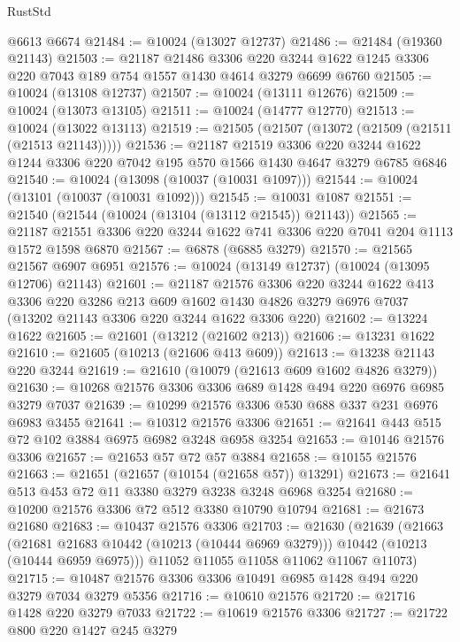 \begin{lexlean}{RustStd}
\begin{coremodule}
    @6613
    @6674
@21484 := @10024 (@13027 @12737)
@21486 := @21484 (@19360 @21143)
@21503 := @21187
    @21486
    @3306
    @220
    @3244
    @1622
    @1245
    @3306
    @220
    @7043
    @189
    @754
    @1557
    @1430
    @4614
    @3279
    @6699
    @6760
@21505 := @10024 (@13108 @12737)
@21507 := @10024 (@13111 @12676)
@21509 := @10024 (@13073 @13105)
@21511 := @10024 (@14777 @12770)
@21513 := @10024 (@13022 @13113)
@21519 := @21505 (@21507 (@13072 (@21509 (@21511 (@21513 @21143)))))
@21536 := @21187
    @21519
    @3306
    @220
    @3244
    @1622
    @1244
    @3306
    @220
    @7042
    @195
    @570
    @1566
    @1430
    @4647
    @3279
    @6785
    @6846
@21540 := @10024 (@13098 (@10037 (@10031 @1097)))
@21544 := @10024 (@13101 (@10037 (@10031 @1092)))
@21545 := @10031 @1087
@21551 := @21540 (@21544 (@10024 (@13104 (@13112 @21545)) @21143))
@21565 := @21187 @21551 @3306 @220 @3244 @1622 @741 @3306 @220 @7041 @204 @1113 @1572 @1598 @6870
@21567 := @6878 (@6885 @3279)
@21570 := @21565 @21567 @6907 @6951
@21576 := @10024 (@13149 @12737) (@10024 (@13095 @12706) @21143)
@21601 := @21187
    @21576
    @3306
    @220
    @3244
    @1622
    @413
    @3306
    @220
    @3286
    @213
    @609
    @1602
    @1430
    @4826
    @3279
    @6976
    @7037
    (@13202 @21143 @3306 @220 @3244 @1622 @3306 @220)
@21602 := @13224 @1622
@21605 := @21601 (@13212 (@21602 @213))
@21606 := @13231 @1622
@21610 := @21605 (@10213 (@21606 @413 @609))
@21613 := @13238 @21143 @220 @3244
@21619 := @21610 (@10079 (@21613 @609 @1602 @4826 @3279))
@21630 := @10268 @21576 @3306 @3306 @689 @1428 @494 @220 @6976 @6985 @3279 @7037
@21639 := @10299 @21576 @3306 @530 @688 @337 @231 @6976 @6983 @3455
@21641 := @10312 @21576 @3306
@21651 := @21641 @443 @515 @72 @102 @3884 @6975 @6982 @3248 @6958 @3254
@21653 := @10146 @21576 @3306
@21657 := @21653 @57 @72 @57 @3884
@21658 := @10155 @21576
@21663 := @21651 (@21657 (@10154 (@21658 @57)) @13291)
@21673 := @21641 @513 @453 @72 @11 @3380 @3279 @3238 @3248 @6968 @3254
@21680 := @10200 @21576 @3306 @72 @512 @3380 @10790 @10794
@21681 := @21673 @21680
@21683 := @10437 @21576 @3306
@21703 := @21630
    (@21639
      (@21663
        (@21681 @21683 @10442 (@10213 (@10444 @6969 @3279)))
        @10442
        (@10213 (@10444 @6959 @6975)))
      @11052
      @11055
      @11058
      @11062
      @11067
      @11073)
@21715 := @10487 @21576 @3306 @3306 @10491 @6985 @1428 @494 @220 @3279 @7034 @3279 @5356
@21716 := @10610 @21576
@21720 := @21716 @1428 @220 @3279 @7033
@21722 := @10619 @21576 @3306
@21727 := @21722 @800 @220 @1427 @245 @3279

\end{coremodule}
\end{lexlean}
